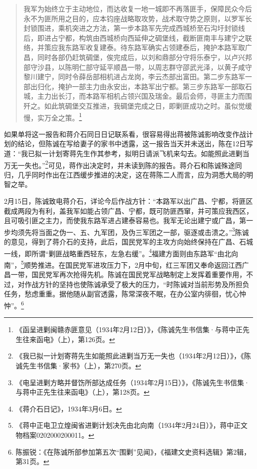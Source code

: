 \begin{quote}

我军为始终立于主动地位，而达收复一地一城即不再落匪手，保障民众今后永不为匪所用之目的，应本钧座战略取攻势，战术取守势之原则，以罗军长封锁围进，乘机突进之方法，第一步本路军先完成西城桥至石沟圩封锁线后，即进占宁都，构筑由西城桥向西延伸之碉堡线，截断匪南丰与建宁之联络，并策应我东路军收复建泰。待东路军确实占领建泰后，掩护本路军取广昌，同时各部仍赶筑碉堡，俟完成后，以刘和鼎部分守将乐泰宁，以卢兴邦部守沙县，以陈明仁部守延平顺昌一带，以周志群守邵武光泽，以黄子咸守黎川建宁，同时令薛岳部相机进占龙岗，李云杰部出富田。第二步东路军一部出归化，掩护一部主力由永安出，本路军出宁都。第三步东路军一部取石城，主力出长汀，而本路军相机占领兴国及瑞金。最后会师，寻匪主力而围歼之。如此筑碉堡交互推进，我碉堡完成之日，即剿匪成功之时。虽似觉缓慢，实万全之策。\footnote{《函呈进剿闽赣赤匪意见（1934年2月12日）》，《陈诚先生书信集·与蒋中正先生往来函电》（上），第126页。}
\end{quote}


如果单将这一报告和蒋介石同日日记联系看，很容易得出蒋被陈诚影响改变作战计划的结论，但陈诚在写给妻子的家书中透露，这一报告当天并未送出，陈在12日写道：“我已拟一计划寄蒋先生作其参考，拟明日请派飞机来勾去。如能照此进剿当万无一失也。”\footnote{《我已拟一计划寄蒋先生如能照此进剿当万无一失也（1934年2月12日）》，《陈诚先生书信集·家书》（上），第270页。}可见，蒋作出决定时，并未读到陈的报告。蒋介石和陈诚殊途同归，几乎同时作出在江西缓步推进的决定，这在蒋陈二人而言，应为洞悉大局的明智之举。


2月15日，陈诚致电蒋介石，详论今后作战方针：“本路军以出广昌、宁都，将匪区截成两段为有利，盖我军如能占领广昌、宁都，既可防匪西窜，并可策应我西区，且可吸引匪之主力，而使我东路军进占建泰容易也。我军无论出建宁或广昌，第一步均须先将当面之伪一、五、九军团，及伪三军团之一部，驱逐或击溃之。”\footnote{《电呈进剿方略并督饬所部达成任务（1934年2月15日）》，《陈诚先生书信集·与蒋中正先生往来函电》（上），第128页。}陈诚的意见，得到了蒋介石的支持，此后，国民党军的主攻方向始终保持在广昌、石城一线，即所谓“剿匪战略重西轻东，左急右缓”。\footnote{《蒋介石日记》，1934年3月6日。}福建方面则由东路军“由北向南”，\footnote{《蒋中正电卫立煌闽省进剿计划决先由北向南（1934年2月24日）》，蒋中正文物档案0202000200011。}顺势推进。在国民党军进攻压力下，2月中旬，红三军团又奉命返回江西广昌一带，国民党军再次抢得先机。陈诚在国民党军战略制定上发挥着重要作用，不过，对作战方针的坚持也使陈诚承受了极大的压力，“时陈诚对当前形势及所担负任务，愁虑重重。据他随从副官透露，陈常深夜不眠，在办公室内徘徊，忧心忡忡”。\footnote{陈振锐：《在陈诚所部参加第五次“围剿”见闻》，《福建文史资料选辑》第2辑，第31页。}


